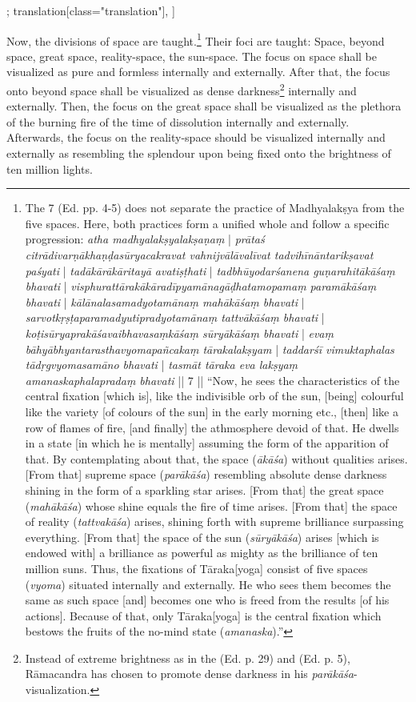 \begin{alignment}[
  texts=edition[class="edition"];
  translation[class="translation"],
  ]
\begin{translation}
\begin{tlate}[p28_01]
      \noindent
 Now, the divisions of space are taught.\footnote{The  7 (Ed. pp. 4-5) does not separate the practice of Madhyalakṣya from the five spaces. Here, both practices form a unified whole and follow a specific progression: \textit{atha madhyalakṣyalakṣaṇaṃ} | \textit{prātaś citrādivarṇākhaṇḍasūryacakravat vahnijvālāvalīvat tadvihīnāntarikṣavat paśyati} | \textit{tadākārākāritayā avatiṣṭhati} | \textit{tadbhūyodarśanena guṇarahitākāśaṃ bhavati} | \textit{visphurattārakākāradīpyamānagāḍhatamopamaṃ paramākāśaṃ bhavati} | \textit{kālānalasamadyotamānaṃ mahākāśaṃ bhavati} | \textit{sarvotkṛṣṭaparamadyutipradyotamānaṃ tattvākāśaṃ bhavati} | \textit{koṭisūryaprakāśavaibhavasaṃkāśaṃ sūryākāśaṃ bhavati} | \textit{evaṃ bāhyābhyantarasthavyomapañcakaṃ tārakalakṣyam} | \textit{taddarśī vimuktaphalas tādṛgvyomasamāno bhavati} | \textit{tasmāt tāraka eva lakṣyaṃ amanaskaphalapradaṃ bhavati} || 7 || ``Now, he sees the characteristics of the central fixation [which is], like the indivisible orb of the sun, [being] colourful like the variety [of colours of the sun] in the early morning etc., [then] like a row of flames of fire, [and finally] the athmosphere devoid of that. He dwells in a state [in which he is mentally] assuming the form of the apparition of that. By contemplating about that, the space (\textit{ākāśa}) without qualities arises. [From that] supreme space (\textit{parākāśa}) resembling absolute dense darkness shining in the form of a sparkling star arises. [From that] the great space (\textit{mahākāśa}) whose shine equals the fire of time arises. [From that] the space of reality (\textit{tattvakāśa}) arises, shining forth with supreme brilliance surpassing everything. [From that] the space of the sun (\textit{sūryākāśa}) arises [which is endowed with] a brilliance as powerful as mighty as the brilliance of ten million suns. Thus, the fixations of Tāraka[yoga] consist of five spaces (\textit{vyoma}) situated internally and externally. He who sees them becomes the same as such space [and] becomes one who is freed from the results [of his actions]. Because of that, only Tāraka[yoga] is the central fixation which bestows the fruits of the no-mind state (\textit{amanaska}).''}
 Their foci are taught: Space, beyond space, great space, reality-space, the sun-space. The focus on space shall be visualized as pure and formless internally and externally. After that, the focus onto beyond space shall be visualized as dense darkness\footnote{Instead of extreme brightness as in the  (Ed. p. 29) and  (Ed. p. 5), Rāmacandra has chosen to promote dense darkness in his \textit{parākāśa}-visualization.} internally and externally. Then, the focus on the great space shall be visualized as the plethora of the burning fire of the time of dissolution internally and externally. Afterwards, the focus on the reality-space should be visualized internally and externally as resembling the splendour upon being fixed onto the brightness of ten million lights.
 \flushpage 
\end{tlate}
  \end{translation}
\end{alignment}
